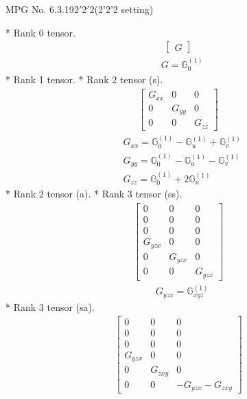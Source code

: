 \documentclass[fleqn,8pt,landscape]{jsarticle}
\begin{document}
\setcounter{MaxMatrixCols}{32}

\renewcommand{\tablename}{Table~}
\renewcommand{\figurename}{Figure~}
\begin{center}
\LARGE
MPG No. 6.3.19\quad$2'2'2$\quad(2'2'2 setting)
\end{center}
* Rank 0 tensor.
\begin{align*}
\begin{bmatrix} G \end{bmatrix}
\end{align*}
\begin{align*}
& G = \mathbb{G}_{0}^{(1)}
\end{align*}
* Rank 1 tensor.
* Rank 2 tensor (s).
\begin{align*}
\begin{bmatrix} G_{xx} & 0 & 0 \\ 0 & G_{yy} & 0 \\ 0 & 0 & G_{zz} \end{bmatrix}
\end{align*}
\begin{align*}
& G_{xx} = \mathbb{G}_{0}^{(1)} - \mathbb{G}_{u}^{(1)} + \mathbb{G}_{v}^{(1)} \\
& G_{yy} = \mathbb{G}_{0}^{(1)} - \mathbb{G}_{u}^{(1)} - \mathbb{G}_{v}^{(1)} \\
& G_{zz} = \mathbb{G}_{0}^{(1)} + 2 \mathbb{G}_{u}^{(1)}
\end{align*}
* Rank 2 tensor (a).
* Rank 3 tensor (ss).
\begin{align*}
\begin{bmatrix} 0 & 0 & 0 \\ 0 & 0 & 0 \\ 0 & 0 & 0 \\ G_{yzx} & 0 & 0 \\ 0 & G_{yzx} & 0 \\ 0 & 0 & G_{yzx} \end{bmatrix}
\end{align*}
\begin{align*}
& G_{yzx} = \mathbb{G}_{xyz}^{(1)}
\end{align*}
* Rank 3 tensor (sa).
\begin{align*}
\begin{bmatrix} 0 & 0 & 0 \\ 0 & 0 & 0 \\ 0 & 0 & 0 \\ G_{yzx} & 0 & 0 \\ 0 & G_{zxy} & 0 \\ 0 & 0 & - G_{yzx} - G_{zxy} \end{bmatrix}
\end{align*}
\end{document}
